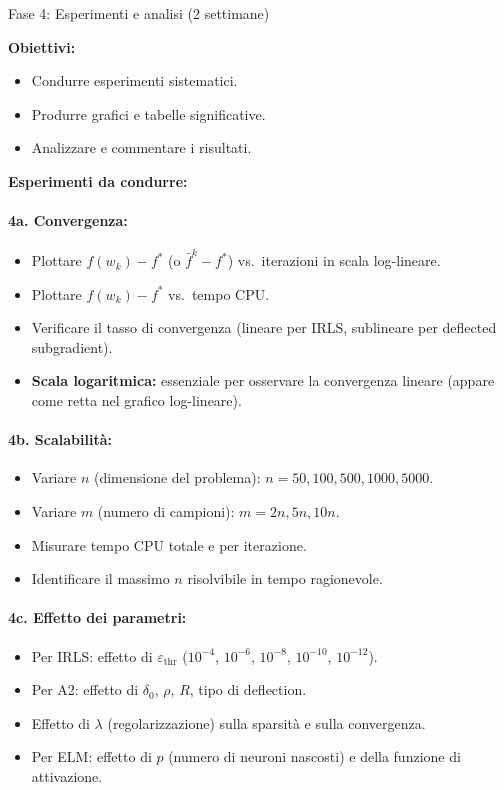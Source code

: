 \documentclass[a4paper,11pt]{article}
\begin{document}
\begin{phasebox}{Fase 4: Esperimenti e analisi (2 settimane)}

\textbf{Obiettivi:}
\begin{itemize}[nosep]
  \item Condurre esperimenti sistematici.
  \item Produrre grafici e tabelle significative.
  \item Analizzare e commentare i risultati.
\end{itemize}

\textbf{Esperimenti da condurre:}

\paragraph{4a. Convergenza:}
\begin{itemize}[nosep]
  \item Plottare $f(w_k) - f^*$ (o $\bar{f}^k - f^*$) vs.\ iterazioni in scala log-lineare.
  \item Plottare $f(w_k) - f^*$ vs.\ tempo CPU.
  \item Verificare il tasso di convergenza (lineare per IRLS, sublineare per deflected subgradient).
  \item \textbf{Scala logaritmica:} essenziale per osservare la convergenza lineare (appare come retta nel grafico log-lineare).
\end{itemize}

\paragraph{4b. Scalabilità:}
\begin{itemize}[nosep]
  \item Variare $n$ (dimensione del problema): $n = 50, 100, 500, 1000, 5000$.
  \item Variare $m$ (numero di campioni): $m = 2n, 5n, 10n$.
  \item Misurare tempo CPU totale e per iterazione.
  \item Identificare il massimo $n$ risolvibile in tempo ragionevole.
\end{itemize}

\paragraph{4c. Effetto dei parametri:}
\begin{itemize}[nosep]
  \item Per IRLS: effetto di $\varepsilon_{\text{thr}}$ ($10^{-4}$, $10^{-6}$, $10^{-8}$, $10^{-10}$, $10^{-12}$).
  \item Per A2: effetto di $\delta_0$, $\rho$, $R$, tipo di deflection.
  \item Effetto di $\lambda$ (regolarizzazione) sulla sparsità e sulla convergenza.
  \item Per ELM: effetto di $p$ (numero di neuroni nascosti) e della funzione di attivazione.
\end{itemize}


\end{phasebox}
\end{document}
